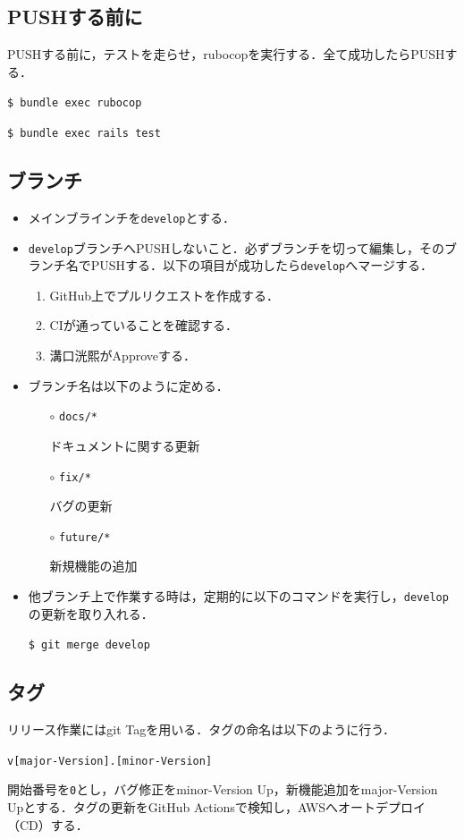 \subsection{PUSHする前に}\label{q3.3.1}
PUSHする前に，テストを走らせ，rubocopを実行する．全て成功したらPUSHする．
\begin{screen}
    \texttt{\$ bundle exec rubocop}
    
    \texttt{\$ bundle exec rails test}
\end{screen}

\subsection{ブランチ}\label{q3.3.2}
\begin{itemize}
    \item メインブラインチを\texttt{develop}とする．
    
    \item \texttt{develop}ブランチへPUSHしないこと．必ずブランチを切って編集し，そのブランチ名でPUSHする．以下の項目が成功したら\texttt{develop}へマージする．
    \begin{enumerate}
        \item GitHub上でプルリクエストを作成する．
        \item CIが通っていることを確認する．
        \item 溝口洸熙がApproveする．
    \end{enumerate}
    
    \item ブランチ名は以下のように定める．
    \begin{itemize}
        \item[$\circ$] \texttt{docs/*}

        ドキュメントに関する更新
        \item[$\circ$] \texttt{fix/*}

        バグの更新
        \item[$\circ$] \texttt{future/*}

        新規機能の追加
    \end{itemize}
    
    \item 他ブランチ上で作業する時は，定期的に以下のコマンドを実行し，\texttt{develop}の更新を取り入れる．
    \begin{screen}
        \texttt{\$ git merge develop}
    \end{screen}
\end{itemize}

\subsection{タグ}\label{q3.3.3}
リリース作業にはgit Tagを用いる．タグの命名は以下のように行う．
\begin{screen}
    \texttt{v[major-Version].[minor-Version]}
\end{screen}

開始番号を\texttt{0}とし，バグ修正をminor-Version Up，新機能追加をmajor-Version Upとする．タグの更新をGitHub Actionsで検知し，AWSへオートデプロイ（CD）する．

